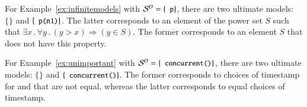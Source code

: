\begin{example}
For Example~\ref{ex:infinitemodels} with $\oschema = \{\dedalus{p}\}$, there are two ultimate models:
$\{\}$ and $\{\dedalus{p(n1)}\}$.  The latter corresponds to an element of the power set $S$ such that $\exists x \, . \, \forall y \, . \, (y > x) \Rightarrow (y \in S)$.  The former corresponds to an element $S$ that does not have this property.

For Example~\ref{ex:unimportant} with $\oschema = \{\dedalus{concurrent()}\}$, there are two ultimate models: $\{\}$ and $\{\dedalus{concurrent()}\}$.  The former corresponds to choices of timestamp for  and  that are not equal, whereas the latter corresponds to equal choices of timestamp.
\end{example}




